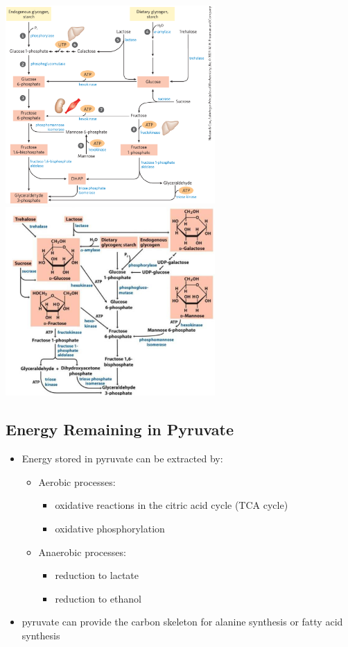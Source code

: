 \documentclass[10pt]{article}
\begin{document}
\begin{center} 
	\includegraphics*[width=0.6\textwidth]{L2_5.png} \\
    \includegraphics*[width=0.6\textwidth]{L2_6.png} 
\end{center}

\subsection*{Energy Remaining in Pyruvate}
\begin{itemize}
	\item Energy stored in pyruvate can be extracted by:
	\begin{itemize}
        \item Aerobic processes:
        \begin{itemize}
            \item oxidative reactions in the citric acid cycle (TCA cycle)
            \item oxidative phosphorylation
        \end{itemize}
        \item Anaerobic processes:
        \begin{itemize}
            \item reduction to lactate
            \item reduction to ethanol
        \end{itemize}
    \end{itemize}
    \item pyruvate can provide the carbon skeleton for alanine synthesis or fatty acid synthesis
\end{itemize}
\end{document}
